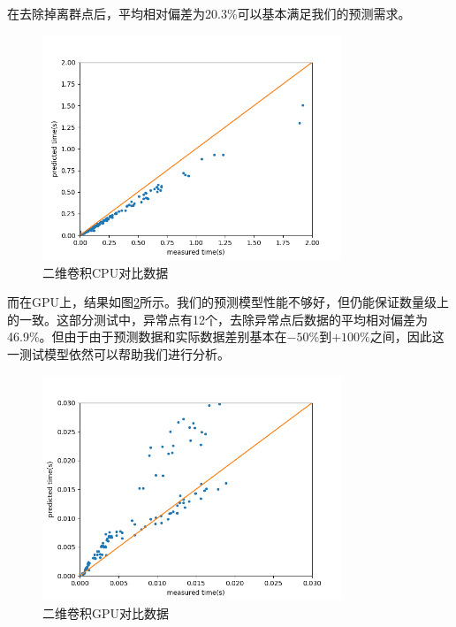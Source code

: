    在去除掉离群点后，平均相对偏差为20.3\%可以基本满足我们的预测需求。

    \begin{figure}[!htbp]
        \centering
        \includegraphics[width=0.8\textwidth]{figures/conv_cpu_cmp.png}
        \caption{二维卷积CPU对比数据}
        \label{fig:conv_cpu_cmp}
    \end{figure}

    而在GPU上，结果如图\ref{fig:conv_gpu_cmp}所示。我们的预测模型性能不够好，但仍能保证数量级上的一致。这部分测试中，异常点有12个，去除异常点后数据的平均相对偏差为46.9\%。但由于由于预测数据和实际数据差别基本在$ -50\% $到$ +100\% $之间，因此这一测试模型依然可以帮助我们进行分析。

    \begin{figure}[!htbp]
        \centering
        \includegraphics[width=0.8\textwidth]{figures/conv_gpu_cmp.png}
        \caption{二维卷积GPU对比数据}
        \label{fig:conv_gpu_cmp}
    \end{figure}

